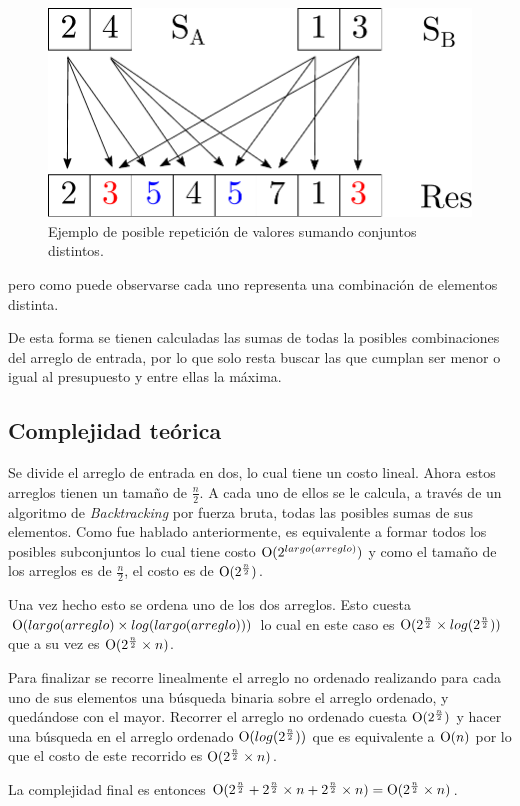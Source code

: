 \begin{figure}[H]
	\centering
	\includegraphics[scale=0.6]{imagenes/ex1_example2.pdf}
	\caption{Ejemplo de posible repetición de valores sumando conjuntos
	distintos.}
	\label{ej1:fig:value_repetition}
\end{figure}


pero como puede observarse cada uno representa una combinación de elementos
distinta.

De esta forma se tienen calculadas las sumas de todas la posibles combinaciones
del arreglo de entrada, por lo que solo resta buscar las que cumplan ser menor o
igual al presupuesto y entre ellas la máxima.


\subsection{Complejidad teórica}

Se divide el arreglo de entrada en dos, lo cual tiene un costo lineal. Ahora estos arreglos tienen un tamaño de $\frac{n}{2}$. A cada uno de ellos se le calcula, a través de un algoritmo de \textit{Backtracking} por fuerza bruta, todas las posibles sumas de sus elementos. Como fue hablado anteriormente, es equivalente a formar todos los posibles subconjuntos lo cual tiene costo $\operatorname{O}(2^{largo(arreglo)})$  y como el tamaño de los arreglos es de $\frac{n}{2}$, el costo es de $\operatorname{O}(2^{\frac{n}{2}})$.

Una vez hecho esto se ordena uno de los dos arreglos. Esto cuesta $\operatorname{O}(largo(arreglo) \times log(largo(arreglo)))$ lo cual en este caso es $\operatorname{O}(2^{\frac{n}{2}} \times log(2^{\frac{n}{2}}))$ que a su vez es $\operatorname{O}(2^{\frac{n}{2}} \times n)$.

Para finalizar se recorre linealmente el arreglo no ordenado realizando para cada uno de sus elementos una búsqueda binaria sobre el arreglo ordenado, y quedándose con el mayor. Recorrer el arreglo no ordenado cuesta $\operatorname{O}(2^{\frac{n}{2}})$ y hacer una búsqueda en el arreglo ordenado $\operatorname{O}(log(2^{\frac{n}{2}}))$ que es equivalente a $\operatorname{O}(n)$ por lo que el costo de este recorrido es $\operatorname{O}(2^{\frac{n}{2}} \times n)$.

La complejidad final es entonces $\operatorname{O}(2^{\frac{n}{2}} + 2^{\frac{n}{2}} \times n + 2^{\frac{n}{2}} \times n) = \operatorname{O}(2^{\frac{n}{2}} \times n)$.